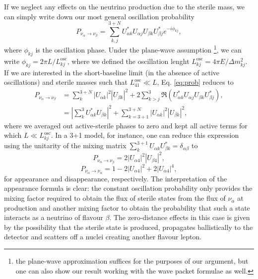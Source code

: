 If we neglect any effects on the neutrino production due to the sterile mass, we can simply write down our most general oscillation probability
\begin{equation}
 P_{\nu_{\alpha} \to \nu_{\beta}} = \sum_{k, j}^{3+N} U^*_{\alpha k} U_{\alpha j} U_{\beta k} U^*_{\beta j} e^{- i \phi_{k j}}, \label{eq:prob}
\end{equation}
where $\phi_{k j}$ is the oscillation phase. Under the plane-wave assumption \footnote{the plane-wave approximation suffices for the purposes of our argument, but one can also show our result working with the wave packet formulae as well.}, we can write $\phi_{k j} = 2\pi L / L^{\text{osc}}_{k j}$, where we defined the oscillation lenght $L^{\text{osc}}_{k j} = 4 \pi E / \Delta m^2_{k j}$. If we are interested in the short-baseline limit (in the absence of active oscillations) and sterile masses such that $L^{\text{osc}}_{41} \ll L$, Eq. \ref{eq:prob} reduces to
\begin{align}
 P_{\nu_{\alpha} \to \nu_{\beta}} &= \sum_{k}^{3+N} |U_{\alpha k}|^2|U_{\beta k}|^2 + 2 \sum_{k > j}^{3}\Re{\left( U^*_{\alpha k} U_{\alpha j} U_{\beta k} U^*_{\beta j} \right)}, \nonumber \\
 &= \left| \sum_{k}^{3} U_{\alpha k}^* U_{\beta k} \right|^2 + \sum_{k=3+1}^{3+N} |U_{\alpha k}|^2 |U_{\beta k}|^2,
\end{align}
where we averaged out active-sterile phases to zero and kept all active terms for which $L \ll L^{\text{osc}}_{k j}$. In a 3+1 model, for instance, one can reduce this expression using the unitarity of the mixing matrix $\sum_k^{3+1} U_{\alpha k} U_{\beta k}^* = \delta_{\alpha \beta}$ to
\begin{equation}
 P_{\nu_{\alpha} \to \nu_{\beta}} = 2 |U_{\alpha 4}|^2 |U_{\beta 4}|^2,\label{eq:AOS3+1app}
\end{equation}
\begin{equation}
 P_{\nu_{\alpha} \to \nu_{\alpha}} = 1 - 2 |U_{\alpha 4}|^2 + 2|U_{\alpha 4}|^4,\label{eq:AOS3+1dis}
\end{equation}
for appearance and disappearance, respectively. The interpretation of the appearance formula is clear: the constant oscillation probability only provides the mixing factor required to obtain the flux of sterile states from the flux of $\nu_{\alpha}$ at production and another mixing factor to obtain the probability that such a state interacts as a neutrino of flavour $\beta$. The zero-distance effects in this case is given by the possibility that the sterile state is produced, propagates ballistically to the detector and scatters off a nuclei creating another flavour lepton.

